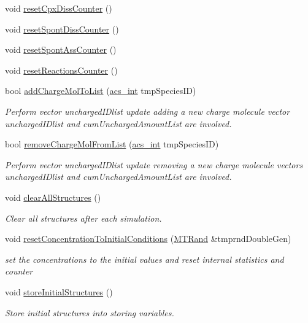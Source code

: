 \begin{DoxyCompactItemize}
void \hyperlink{a00003_a987dc7b9f211f34564343ee0eaa20dc1}{reset\-Cpx\-Diss\-Counter} ()
\item 
void \hyperlink{a00003_a9c22cb9b69207398e35c9c155e2e35ce}{reset\-Spont\-Diss\-Counter} ()
\item 
void \hyperlink{a00003_a98baed580212dad8ef48a22bfe7e1295}{reset\-Spont\-Ass\-Counter} ()
\item 
void \hyperlink{a00003_a5c8713237992b28c39199a7aea3f9ea0}{reset\-Reactions\-Counter} ()
\item 
bool \hyperlink{a00003_a7981c34d16c0b1e9e6ca3ea69aa3a8a3}{add\-Charge\-Mol\-To\-List} (\hyperlink{a00016_a8d277355641a098190360234e2ebde35}{acs\-\_\-int} tmp\-Species\-I\-D)
\begin{DoxyCompactList}\small\item\em Perform vector uncharged\-I\-Dlist update adding a new charge molecule vector uncharged\-I\-Dlist and cum\-Uncharged\-Amount\-List are involved. \end{DoxyCompactList}\item 
bool \hyperlink{a00003_aa4830018af0b99eddefcdefad877b305}{remove\-Charge\-Mol\-From\-List} (\hyperlink{a00016_a8d277355641a098190360234e2ebde35}{acs\-\_\-int} tmp\-Species\-I\-D)
\begin{DoxyCompactList}\small\item\em Perform vector uncharged\-I\-Dlist update removing a new charge molecule vectors uncharged\-I\-Dlist and cum\-Uncharged\-Amount\-List are involved. \end{DoxyCompactList}\item 
void \hyperlink{a00003_aa860227725dbe5b0251a25f440773161}{clear\-All\-Structures} ()
\begin{DoxyCompactList}\small\item\em Clear all structures after each simulation. \end{DoxyCompactList}\item 
void \hyperlink{a00003_ad8000316befe74598a123bdcd7024697}{reset\-Concentration\-To\-Initial\-Conditions} (\hyperlink{a00008}{M\-T\-Rand} \&tmprnd\-Double\-Gen)
\begin{DoxyCompactList}\small\item\em set the concentrations to the initial values and reset internal statistics and counter \end{DoxyCompactList}\item 
void \hyperlink{a00003_a7fc3937fb586db93c33f7f091dc99626}{store\-Initial\-Structures} ()
\begin{DoxyCompactList}\small\item\em Store initial structures into storing variables. \end{DoxyCompactList}\item 

\end{DoxyCompactItemize}
